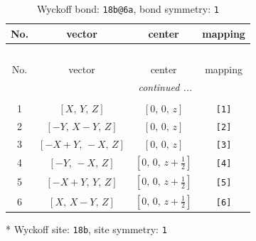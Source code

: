 \documentclass[fleqn,8pt]{jsarticle}
\begin{document}
\begin{longtable}{cccc}
\caption{Wyckoff bond: {\tt 18b@6a}, bond symmetry: {\tt 1}}
 \\
 \hline \hline
No. & vector & center & mapping \\ \hline \endfirsthead

\multicolumn{3}{l}{\tablename\ \thetable{}} \\
 \hline \hline
No. & vector & center & mapping \\ \hline \endhead

 \hline \hline
\multicolumn{3}{r}{\footnotesize\it continued ...} \\ \endfoot

 \hline \hline
\multicolumn{3}{r}{} \\ \endlastfoot

1 & $\left[ X,\, Y,\, Z \right]$ & $\left[ 0,\, 0,\, z \right]$ & {\tt [1]} \\ \hline
2 & $\left[ - Y,\, X - Y,\, Z \right]$ & $\left[ 0,\, 0,\, z \right]$ & {\tt [2]} \\ \hline
3 & $\left[ - X + Y,\, - X,\, Z \right]$ & $\left[ 0,\, 0,\, z \right]$ & {\tt [3]} \\ \hline
4 & $\left[ - Y,\, - X,\, Z \right]$ & $\left[ 0,\, 0,\, z + \frac{1}{2} \right]$ & {\tt [4]} \\ \hline
5 & $\left[ - X + Y,\, Y,\, Z \right]$ & $\left[ 0,\, 0,\, z + \frac{1}{2} \right]$ & {\tt [5]} \\ \hline
6 & $\left[ X,\, X - Y,\, Z \right]$ & $\left[ 0,\, 0,\, z + \frac{1}{2} \right]$ & {\tt [6]} \\
\end{longtable}
* Wyckoff site: {\tt 18b}, site symmetry: {\tt 1}
\renewcommand{\arraystretch}{1.2}
\end{document}
